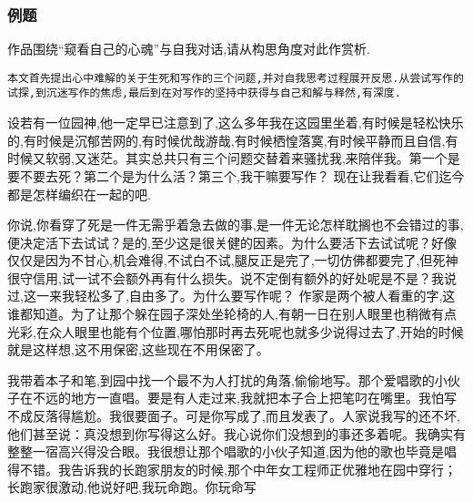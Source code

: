 \documentclass{ctexart}
\newcommand{\nm}{\normalsize}
\renewcommand{\\}{\par}
\begin{document}
\subsubsection{例题}
作品围绕``窥看自己的心魂''与自我对话,请从构思角度对此作赏析.\\
\texttt{本文首先提出心中难解的关于生死和写作的三个问题,并对自我思考过程展开反思.从尝试写作的试探,到沉迷写作的焦虑,最后到在对写作的坚持中获得与自己和解与释然,有深度.}
\nm \fangsong \\设若有一位园神,他一定早已注意到了,这么多年我在这园里坐着,有时候是轻松快乐的,有时候是沉郁苦网的,有时候优哉游哉,有时候栖惶落寞,有时候平静而且自信,有时候又软弱,又迷茫。其实总共只有三个问题交替着来骚扰我,来陪伴我。第一个是要不要去死？第二个是为什么活？第三个,我干嘛要写作？ 现在让我看看,它们迄今都是怎样编织在一起的吧.\\你说,你看穿了死是一件无需乎着急去做的事,是一件无论怎样耽搁也不会错过的事,便决定活下去试试？是的,至少这是很关健的因素。为什么要活下去试试呢？好像仅仅是因为不甘心,机会难得,不试白不试,腿反正是完了,一切仿佛都要完了,但死神很守信用,试一试不会额外再有什么损失。说不定倒有额外的好处呢是不是？我说过,这一来我轻松多了,自由多了。为什么要写作呢？ 作家是两个被人看重的字,这谁都知道。为了让那个躲在园子深处坐轮椅的人,有朝一日在别人眼里也稍微有点光彩,在众人眼里也能有个位置,哪怕那时再去死呢也就多少说得过去了,开始的时候就是这样想,这不用保密,这些现在不用保密了。 \\我带着本子和笔,到园中找一个最不为人打扰的角落,偷偷地写。那个爱唱歌的小伙子在不远的地方一直唱。要是有人走过来,我就把本子合上把笔叼在嘴里。我怕写不成反落得尴尬。我很要面子。可是你写成了,而且发表了。人家说我写的还不坏,他们甚至说：真没想到你写得这么好。我心说你们没想到的事还多着呢。我确实有整整一宿高兴得没合眼。我很想让那个唱歌的小伙子知道,因为他的歌也毕竟是唱得不错。我告诉我的长跑家朋友的时候,那个中年女工程师正优雅地在园中穿行；长跑家很激动,他说好吧,我玩命跑。你玩命写
\end{document}
